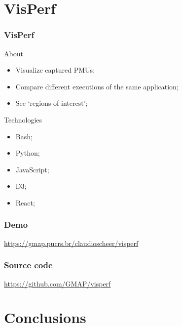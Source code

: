 \documentclass[aspectratio=169]{beamer}
\begin{document}
\section{VisPerf}

\begin{frame}
	\frametitle{VisPerf}

    \begin{block}{About}
        \begin{itemize}
            \item Visualize captured PMUs;
            \item Compare different executions of the same application;
            \item See `regions of interest';
        \end{itemize}
    \end{block}

    \begin{block}{Technologies}
        \begin{itemize}
            \item Bash;
            \item Python;
            \item JavaScript;
            \item D3;
            \item React;
        \end{itemize}
    \end{block}
\end{frame}

\begin{frame}
	\frametitle{Demo}

    \url{https://gmap.pucrs.br/claudioscheer/visperf}
\end{frame}

\begin{frame}
	\frametitle{Source code}

    \url{https://github.com/GMAP/visperf}
\end{frame}

\section{Conclusions}
\end{document}
